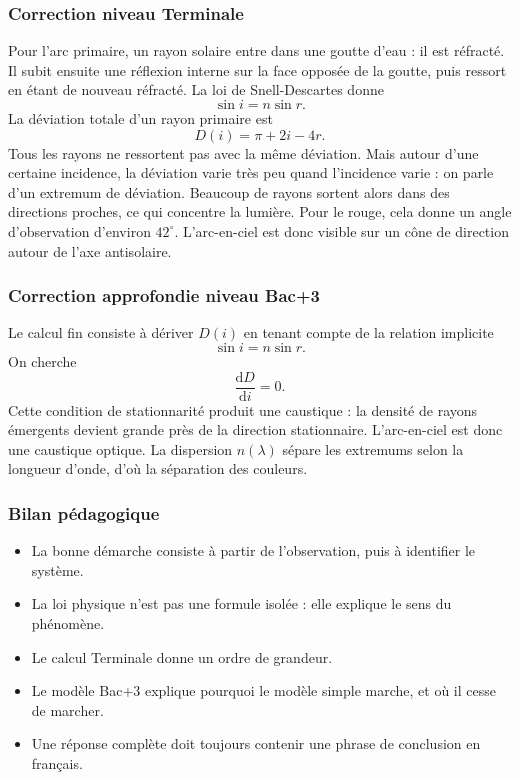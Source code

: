 \documentclass[11pt,a4paper]{article}
\begin{document}
\subsubsection*{Correction niveau Terminale}

\begin{corrigebox}

Pour l'arc primaire, un rayon solaire entre dans une goutte d'eau : il est réfracté. Il subit ensuite une réflexion interne sur la face opposée de la goutte, puis ressort en étant de nouveau réfracté. La loi de Snell-Descartes donne
\[
\sin i=n\sin r.
\]
La déviation totale d'un rayon primaire est
\[
D(i)=\pi+2i-4r.
\]
Tous les rayons ne ressortent pas avec la même déviation. Mais autour d'une certaine incidence, la déviation varie très peu quand l'incidence varie : on parle d'un extremum de déviation. Beaucoup de rayons sortent alors dans des directions proches, ce qui concentre la lumière. Pour le rouge, cela donne un angle d'observation d'environ \(42^\circ\). L'arc-en-ciel est donc visible sur un cône de direction autour de l'axe antisolaire.

\end{corrigebox}

\subsubsection*{Correction approfondie niveau Bac+3}

\begin{approfondissementbox}

Le calcul fin consiste à dériver \(D(i)\) en tenant compte de la relation implicite
\[
\sin i=n\sin r.
\]
On cherche
\[
\frac{\mathrm dD}{\mathrm di}=0.
\]
Cette condition de stationnarité produit une caustique : la densité de rayons émergents devient grande près de la direction stationnaire. L'arc-en-ciel est donc une caustique optique. La dispersion \(n(\lambda)\) sépare les extremums selon la longueur d'onde, d'où la séparation des couleurs.

\end{approfondissementbox}

\subsubsection*{Bilan pédagogique}

\begin{methodebox}
\begin{itemize}
  \item La bonne démarche consiste à partir de l'observation, puis à identifier le système.
  \item La loi physique n'est pas une formule isolée : elle explique le sens du phénomène.
  \item Le calcul Terminale donne un ordre de grandeur.
  \item Le modèle Bac+3 explique pourquoi le modèle simple marche, et où il cesse de marcher.
  \item Une réponse complète doit toujours contenir une phrase de conclusion en français.
\end{itemize}
\end{methodebox}
\end{document}
